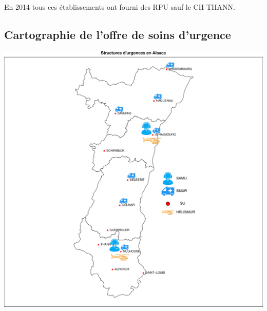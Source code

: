 \documentclass[]{article}
\begin{document}
En 2014 tous ces établissements ont fourni des RPU sauf le CH THANN.

\subsection{Cartographie de l'offre de soins
d'urgence}\label{cartographie-de-loffre-de-soins-durgence}

\begin{center}\includegraphics{Figs/samu_smur_su-1} \end{center}
\end{document}
